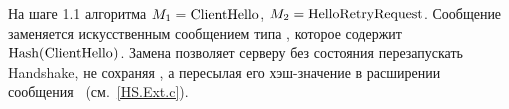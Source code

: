 \begin{note*}
На шаге 1.1 алгоритма $M_1=\code{ClientHello}$, $M_2=\code{HelloRetryRequest}$.
%
Сообщение  заменяется искусственным сообщением типа 
, которое содержит $\code{Hash}(\code{ClientHello})$.
%
Замена позволяет серверу без состояния перезапускать Handshake, не сохраняя
, а пересылая его хэш-значение в расширении
 сообщения~
(см.~\ref{HS.Ext.c}).
\end{note*}

